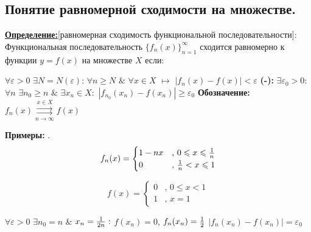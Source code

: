 \documentclass[a4paper,12pt]{article} %
\renewcommand {\geq}{\geqslant}
\renewcommand {\leq}{\leqslant}
\begin{document}
\subsection{Понятие равномерной сходимости на множестве.}

\underline{\textbf{Определение:}}[равномерная сходимость функциональной последовательности]:\newline
Функциональная последовательность $\{f_n(x)\}_{n=1}^\infty$ сходится равномерно к функции $y=f(x)$ на множестве $X$ если: \newline \newline

$\forall \varepsilon > 0 $  $\exists N = N(\varepsilon)$: $\forall n \geq N$  $\&$  $\forall x \in X$ $\longmapsto$ $|f_n(x) -f(x)| < \varepsilon$
\newline \newline
\hspace*{5mm} \noindent \textbf{(-):} $\exists \varepsilon_0>0:$ $\forall n$  $\exists n_0 \geq n$  $\&$  $\exists x_n \in X:$ $|f_{n_0}(x_n)-f(x_n)| \geq \varepsilon_0$ 
\newline \newline
\noindent \textbf{Обозначение:} $f_n(x) \overset{x \in X}{\underset{n \rightarrow \infty}{\rightrightarrows}} f(x)$

\noindent \textbf{Примеры:} .
\begin{equation*}
f_n(x) = 
 \begin{cases}
   1-nx &\text{, $0 \leq x \leq {1 \over n}$}\\
   0 &\text{, ${1\over n}< x\leq 1$}
 \end{cases}
\end{equation*}

\begin{equation*}
f(x) = 
 \begin{cases}
   0 &\text{, $0 \leq x < {1}$}\\
   1 &\text{, $x=1$}
 \end{cases}
\end{equation*}



$\forall \varepsilon > 0$  $\exists n_0 = n$ $\&$ $x_n = {1\over 2n}:$ \newline
\hspace*{40 mm}$f(x_n) = 0$, $f_n(x_n) = {1\over2}$ \newline
\hspace*{40 mm}$|f_n(x_n) - f(x_n)| = \varepsilon_0$
\end{document}
